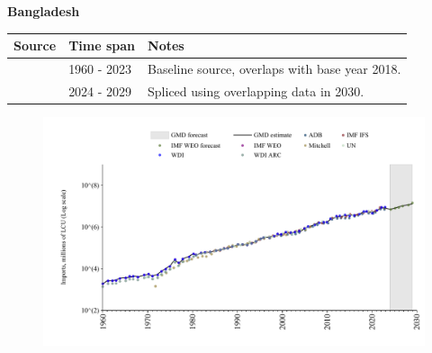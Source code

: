 \documentclass[12pt,a4paper,landscape]{article}
\begin{document}
\begin{adjustbox}{max totalsize={\paperwidth}{\paperheight},center}
\begin{minipage}[t][\textheight][t]{\textwidth}
\vspace*{0.5cm}
{}
\begin{center}
{\Large\bfseries Bangladesh}
\end{center}
\vspace{0.5cm}
\begin{table}[H]
\centering
\small
\begin{tabular}{|l|l|l|}
\hline
\textbf{Source} & \textbf{Time span} & \textbf{Notes} \\
\hline
\rowcolor{white}\cite{WDI}& 1960 - 2023 &Baseline source, overlaps with base year 2018.\\
\rowcolor{lightgray}\cite{IMF_WEO_forecast}& 2024 - 2029 &Spliced using overlapping data in 2030.\\
\hline
\end{tabular}
\end{table}
\begin{figure}[H]
\centering
\includegraphics[width=\textwidth,height=0.6\textheight,keepaspectratio]{graphs/BGD_imports.pdf}
\end{figure}
\end{minipage}
\end{adjustbox}
\end{document}
